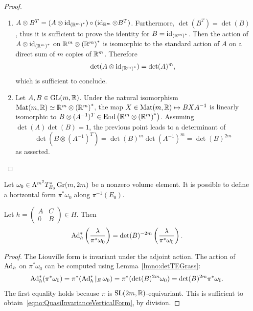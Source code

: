 \documentclass[english]{article}
\begin{document}
\begin{proof}
\begin{enumerate}
	\item $A\otimes B^T = (A \otimes \operatorname{id}_{\left(\mathbb{R}^m \right)^*}) \circ (\operatorname{id}_{\mathbb{R}^m} \otimes B^T)$. Furthermore, $\det(B^T) = \det(B)$, thus it is sufficient to prove the identity for $B=\operatorname{id}_{\left(\mathbb{R}^m \right)^*}$. 
	Then the action of $A \otimes \operatorname{id}_{\left(\mathbb{R}^m \right)^*}$ on $\mathbb{R}^m \otimes \left(\mathbb{R}^m \right)^*$ is isomorphic to the standard action of $A$ on a direct sum of $m$ copies of $\mathbb{R}^m$. Therefore 
	\[
		\det(A \otimes \operatorname{id}_{\left(\mathbb{R}^m \right)^*})
		= 
		\det(A)^m
	,\]
	which is sufficient to conclude.
%
	\item Let $A, B \in \operatorname{GL}(m, \mathbb{R})$.
    Under the natural isomorphism 
    $\operatorname{Mat}(m, \mathbb{R}) \simeq \mathbb{R}^{m}\otimes \left( \mathbb{R}^m \right)^*$,
    the map $X \in \operatorname{Mat}(m, \mathbb{R}) \mapsto B X  A^{-1}$ is linearly isomorphic to $B\otimes (A^{-1})^T \in \operatorname{End}\left( \mathbb{R}^m \otimes \left(\mathbb{R}^m \right)^* \right)$. Assuming $\det(A)\det(B)=1$, the previous point leads to a determinant of
	\[
		\det(B\otimes (A^{-1})^T)
		= \det(B)^m \det(A^{-1})^m
		= \det(B)^{2m}
	\]
	as asserted.
\end{enumerate}
\end{proof}

Let $\omega_0 \in \Lambda^{m^2} T_{E_0}^* \operatorname{Gr}(m,2m)$ be a nonzero volume element. It is possible to define a horizontal form $\pi^*\omega_0$ along $\pi^{-1}({E_0})$.
\begin{lemma}
	Let $h=\begin{pmatrix}
								A & C\\
								0 & B
							\end{pmatrix} \in H$.
	Then 
	\begin{equation}\label{eqno:QuasiInvarianceVerticalForm}
		\operatorname{Ad}_h^*\left(\frac{\lambda}{\pi^*\omega_0}\right)
		= \det(B)^{-2m} \left(\frac{\lambda}{\pi^*\omega_0}\right)
	.\end{equation}
\end{lemma}
\begin{proof}
	The Liouville form is invariant under the adjoint action.
	The action of $\operatorname{Ad}_h$ on $\pi^*\omega_0$ can be computed using Lemma~\ref{lmno:detTEGrass}:
	\[
		\operatorname{Ad}_h^*(\pi^*\omega_0)
		= \pi^*(\operatorname{Ad}_h^*|_E \, \omega_0)
		= \pi^*(\det(B)^{2m} \omega_0)
		= \det(B)^{2m} \pi^*\omega_0
	.\]
    The first equality holds because $\pi$ is $\operatorname{SL}(2m, \mathbb{R})$-equivariant.
	This is sufficient to obtain~\eqref{eqno:QuasiInvarianceVerticalForm}, by division.
\end{proof}
\end{document}
